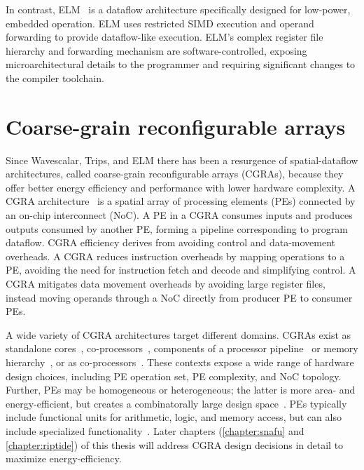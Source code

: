 In contrast, ELM~\cite{balfour2008energy} is a dataflow architecture specifically designed for low-power, embedded operation. 
% 
ELM uses
restricted SIMD execution and operand forwarding to provide
dataflow-like execution.
% 
ELM's complex register file hierarchy and forwarding
mechanism are software-controlled, exposing microarchitectural details to the
programmer and requiring significant changes to the compiler toolchain.

\section{Coarse-grain reconfigurable arrays}
\label{background:cgras}
Since Wavescalar, Trips, and ELM there has been a resurgence of spatial-dataflow architectures, called coarse-grain reconfigurable arrays (CGRAs), because they offer better energy efficiency and performance with lower hardware complexity.
% 
% 
A CGRA architecture~\cite{remarc,adres,matrix,dyser,revamp,opencgra,cgrame,wave,nguyen2021fifer,morphosys,mozart,ppa,fpca,plasticine,dadu2019towards,parashar2013triggered,capstan,nowatzki:isca17:stream-dataflow,goldstein2000piperench,weng2020dsagen,weng2020hybrid,voitsechov2014single,mishra2006tartan,tan2018stitch,karunaratne2017hycube,voitsechov2018inter,evx} is a spatial array of
processing elements (PEs) connected by an on-chip interconnect (NoC).
%
A PE in a CGRA consumes inputs and produces outputs 
consumed by another PE, forming a pipeline corresponding to 
program dataflow.
%
CGRA efficiency derives from avoiding control and data-movement overheads.
%
A CGRA reduces instruction overheads by mapping operations to a PE,
avoiding the need for instruction fetch and decode and simplifying control.
%
A CGRA mitigates data movement overheads by avoiding large register
files, instead moving operands through a NoC directly from 
producer PE to consumer PEs.

A wide variety of CGRA architectures target different domains.
%
CGRAs exist as standalone cores~\cite{trips,raw,swanson2003wavescalar,mishra2006tartan},
co-processors~\cite{tan2018stitch,hauser1997garp,beret,seed,adres,charm,camel,goldstein2000piperench},
components of a processor pipeline~\cite{dyser,dynaspam,chimera}
or memory hierarchy~\cite{livia},
or as co-processors~\cite{plasticine,wave,gorgon,capstan,q100,nowatzki:isca17:stream-dataflow,weng2020hybrid,dadu2019towards,polygraph,taskstream,voitsechov2014single,nguyen2021fifer,morphosys,ppa,fpca}.
%
These contexts expose a wide range of hardware design choices, including PE
operation set, PE complexity, and NoC topology.
% 
Further, PEs may be homogeneous or heterogeneous; the latter is more area- and
energy-efficient, but creates a combinatorally large design space~\cite{revamp}.
% 
PEs typically include functional units for arithmetic, logic,
and memory access, but can also include 
specialized functionality~\cite{snafu,weng2020dsagen,dadu2019towards,q100,gorgon,capstan,polygraph,taskstream}.
% 
Later chapters (\autoref{chapter:snafu} and \autoref{chapter:riptide}) of this thesis will address CGRA design decisions in detail to maximize energy-efficiency.

